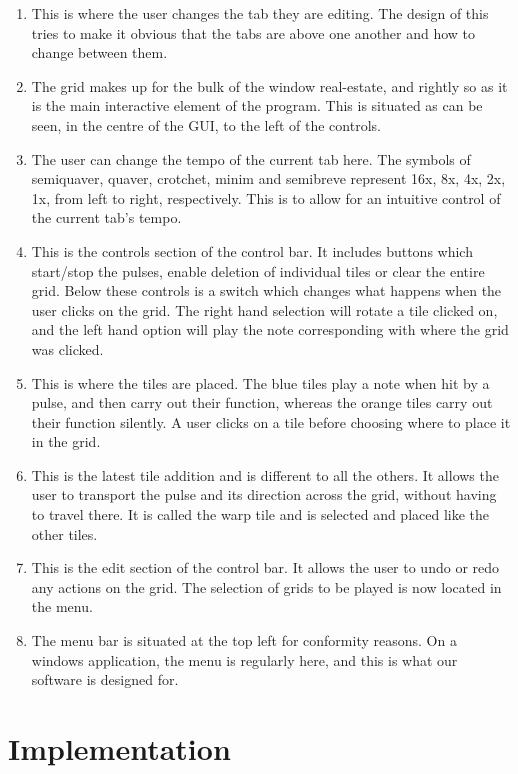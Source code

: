 \documentclass[10pt,a4paper]{article}
\begin{document}
\begin{enumerate}

\item This is where the user changes the tab they are editing. The design of this tries to make it obvious that the tabs are above one another and how to change between them.
\item The grid makes up for the bulk of the window real-estate, and rightly so as it is the main interactive element of the program. This is situated as can be seen, in the centre of the GUI, to the left of the controls.
\item The user can change the tempo of the current tab here. The symbols of semiquaver, quaver, crotchet, minim and semibreve represent 16x, 8x, 4x, 2x, 1x, from left to right, respectively. This is to allow for an intuitive control of the current tab's tempo.
\item This is the controls section of the control bar. It includes buttons which start/stop the pulses, enable deletion of individual tiles or clear the entire grid. Below these controls is a switch which changes what happens when the user clicks on the grid. The right hand selection will rotate a tile clicked on, and the left hand option will play the note corresponding with where the grid was clicked.
\item This is where the tiles are placed. The blue tiles play a note when hit by a pulse, and then carry out their function, whereas the orange tiles carry out their function silently. A user clicks on a tile before choosing where to place it in the grid.
\item This is the latest tile addition and is different to all the others. It allows the user to transport the pulse and its direction across the grid, without having to travel there. It is called the warp tile and is selected and placed like the other tiles.
\item This is the edit section of the control bar. It allows the user to undo or redo any actions on the grid. The selection of grids to be played is now located in the menu.
\item The menu bar is situated at the top left for conformity reasons. On a windows application, the menu is regularly here, and this is what our software is designed for.

\end{enumerate}

\part{Implementation}
\end{document}
